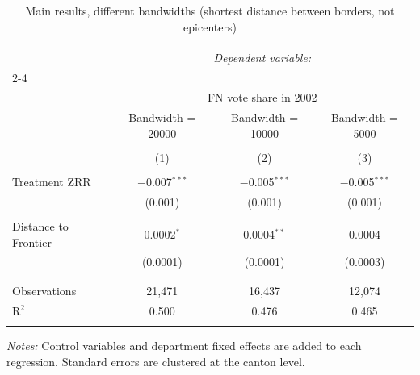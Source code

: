 \begin{appendices}
\begin{table}[!htbp] \centering 
  \caption{Main results, different bandwidths (shortest distance between borders, not epicenters)} 
  \label{tab:rdd_results_diffbandwidth-noEpi}
\footnotesize
\begin{tabular}{@{\extracolsep{5pt}}lccc} 
\\[-1.8ex]\hline 
\hline \\[-1.8ex] 
 & \multicolumn{3}{c}{\textit{Dependent variable:}} \\ 
\cline{2-4} 
\\[-1.8ex] & \multicolumn{3}{c}{FN vote share in 2002} \\ 
 & Bandwidth = 20000 & Bandwidth = 10000 & Bandwidth = 5000 \\ 
\\[-1.8ex] & (1) & (2) & (3)\\ 
\hline \\[-1.8ex] 
 Treatment ZRR & $-$0.007$^{***}$ & $-$0.005$^{***}$ & $-$0.005$^{***}$ \\ 
  & (0.001) & (0.001) & (0.001) \\ 
  & & & \\ 
 Distance to Frontier & 0.0002$^{*}$ & 0.0004$^{**}$ & 0.0004 \\ 
  & (0.0001) & (0.0001) & (0.0003) \\ 
  & & & \\ 
\hline \\[-1.8ex] 
Observations & 21,471 & 16,437 & 12,074 \\ 
R$^{2}$ & 0.500 & 0.476 & 0.465 \\ 
\hline 
\hline \\[-1.8ex] 
\end{tabular} 
\parbox{\textwidth}{\footnotesize \textit{Notes:} Control variables and department fixed effects are added to each regression. Standard errors are clustered at the canton level.}

\end{table} 


\end{appendices}
